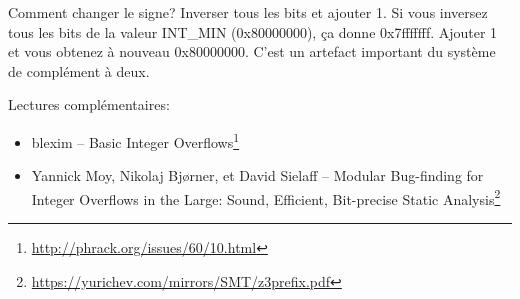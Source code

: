 Comment changer le signe? Inverser tous les bits et ajouter 1.
Si vous inversez tous les bits de la valeur INT\_MIN (0x80000000), ça donne 0x7fffffff.
Ajouter 1 et vous obtenez à nouveau 0x80000000.
C'est un artefact important du système de complément à deux.

Lectures  complémentaires:

\begin{itemize}
\item blexim -- Basic Integer Overflows\footnote{\url{http://phrack.org/issues/60/10.html}}

\item Yannick Moy, Nikolaj Bjørner, et David Sielaff -- Modular Bug-finding for Integer Overflows in the Large: Sound, Efficient, Bit-precise Static Analysis\footnote{\url{https://yurichev.com/mirrors/SMT/z3prefix.pdf}}
\end{itemize}

